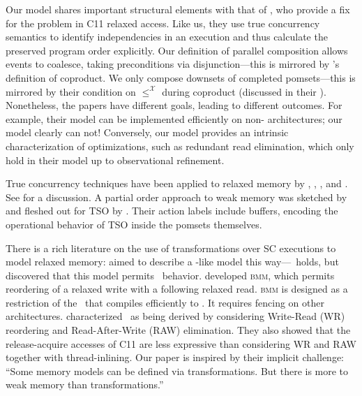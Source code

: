 Our model shares important structural elements with that of
\citet{DBLP:conf/esop/PaviottiCPWOB20}, who provide a fix for the \oota{}
problem in C11 relaxed access.  Like us, they use true concurrency semantics
to identify independencies in an execution and thus calculate the preserved
program order explicitly.  Our definition of parallel composition allows
events to coalesce, taking preconditions via disjunction---this is mirrored
by \citeauthor{DBLP:conf/esop/PaviottiCPWOB20}'s definition of coproduct.  We
only compose downsets of completed pomsets---this is mirrored by their
condition on $\leq^{\mathcal{X}}$ during coproduct (discussed in their
).  Nonetheless, the papers have different goals, leading to
different outcomes.  For example, their model can be implemented efficiently
on non-\mca{} architectures; our model clearly can not!  Conversely, our
model provides an intrinsic characterization of optimizations, such as
redundant read elimination, which only hold in their model up to
observational refinement.




True concurrency techniques have been applied to relaxed memory by
\citet{DBLP:conf/esop/CenciarelliKS07}, \citet{Castellan},
\citet{Pichon-Pharabod:2016:CSR:2837614.2837616}, and
\citet{DBLP:conf/cgo/ChakrabortyV17}.  See
\cite[]{DBLP:journals/lmcs/JeffreyR19} for a discussion.
A partial order approach to weak memory was sketched by \citet{brookes} and
fleshed out for TSO by \citet{DBLP:journals/lmcs/KavanaghB19}.  Their action
labels include buffers, encoding the operational behavior of TSO inside the
pomsets themselves.

There is a rich literature on the use of transformations over SC
executions to model relaxed memory:
%
\citet{Saraswat:2007:TMM:1229428.1229469}
aimed to describe a \jmm-like model this way---\drfsc\ holds, but \citet{SP} 
discovered that this model permits \oota\ behavior.
%
\citet{DBLP:conf/popl/DemangeLZJPV13} developed \textsc{bmm}, which permits
reordering of a relaxed write with a following relaxed read.
\textsc{bmm} is designed as a restriction of the \jmm\ that compiles efficiently to
\tso.  It requires fencing on other architectures.
%
\citet{DBLP:conf/fm/LahavV16} characterized \tso\ as being derived by
considering Write-Read (\textsf{WR}) reordering and Read-After-Write
(\textsf{RAW}) elimination.  They also showed that the release-acquire
accesses of C11 are less expressive than considering \textsf{WR} and
\textsf{RAW} together with thread-inlining.  Our paper is inspired by their
implicit challenge: ``Some memory models can be defined via transformations.
But there is more to weak memory than transformations.''

